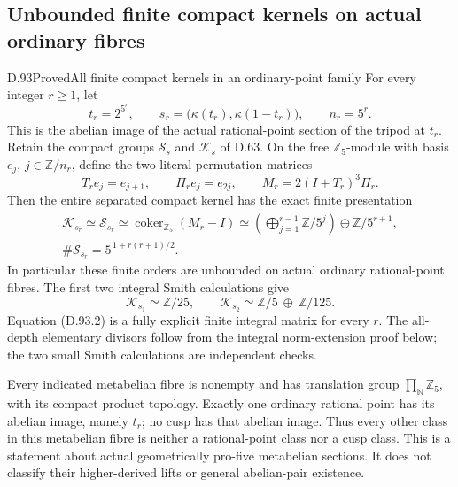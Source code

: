 \subsection{Unbounded finite compact kernels on actual ordinary fibres}

\begin{statement}{D.93}{Proved}{All finite compact kernels in an ordinary-point family}
For every integer \(r\ge1\), let
\[
 t_r=2^{5^r},\qquad
 s_r=\bigl(\kappa(t_r),\kappa(1-t_r)\bigr),
 \qquad n_r=5^r.                                      \tag{D.93.1}
\]
This is the abelian image of the actual rational-point section
of the tripod at \(t_r\). Retain the compact groups
\(\mathcal S_s\) and \(\mathcal K_s\) of D.63.
On the free \(\mathbb Z_5\)-module with basis
\(e_j\), \(j\in\mathbb Z/n_r\), define the two literal
permutation matrices
\[
 T_re_j=e_{j+1},\qquad
 \Pi_re_j=e_{2j},
 \qquad
 M_r=2(I+T_r)^3\Pi_r.                                 \tag{D.93.2}
\]
Then the entire separated compact kernel has the exact finite
presentation
\[
 \begin{gathered}
 \mathcal K_{s_r}\simeq\mathcal S_{s_r}
 \simeq\operatorname{coker}_{\mathbb Z_5}(M_r-I)
 \simeq
 \left(\bigoplus_{j=1}^{r-1}\mathbb Z/5^j\right)
       \oplus\mathbb Z/5^{r+1},\\
 \#\mathcal S_{s_r}=5^{\,1+r(r+1)/2}.
 \end{gathered}                                      \tag{D.93.3}
\]
In particular these finite orders are unbounded on actual
ordinary rational-point fibres. The first two integral Smith
calculations give
\[
 \mathcal K_{s_1}\simeq\mathbb Z/25,\qquad
 \mathcal K_{s_2}\simeq
        \mathbb Z/5\ \oplus\ \mathbb Z/125.             \tag{D.93.4}
\]
Equation (D.93.2) is a fully explicit finite integral matrix
for every \(r\). The all-depth elementary divisors follow from
the integral norm-extension proof below; the two small Smith
calculations are independent checks.

Every indicated metabelian fibre is nonempty and has translation
group \(\prod_{\mathbb N}\mathbb Z_5\), with its compact product
topology. Exactly one ordinary rational point has its abelian
image, namely \(t_r\); no cusp has that abelian image. Thus every
other class in this metabelian fibre is neither a rational-point
class nor a cusp class. This is a statement about actual
geometrically pro-five metabelian sections. It does not classify
their higher-derived lifts or general abelian-pair existence.
\end{statement}

